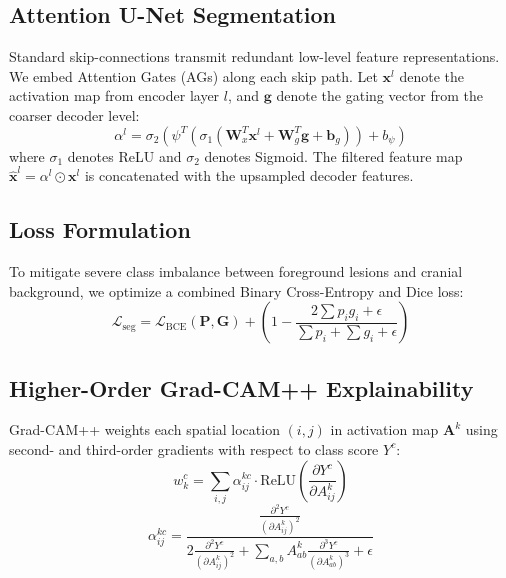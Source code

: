 \documentclass[conference]{IEEEtran}
\begin{document}
\subsection{Attention U-Net Segmentation}
Standard skip-connections transmit redundant low-level feature representations. We embed Attention Gates (AGs) \cite{oktay2018attention} along each skip path. Let $\mathbf{x}^l$ denote the activation map from encoder layer $l$, and $\mathbf{g}$ denote the gating vector from the coarser decoder level:
\begin{equation}
\alpha^l = \sigma_2\left(\psi^T \left(\sigma_1(\mathbf{W}_x^T \mathbf{x}^l + \mathbf{W}_g^T \mathbf{g} + \mathbf{b}_g)\right) + b_\psi\right)
\end{equation}
where $\sigma_1$ denotes ReLU and $\sigma_2$ denotes Sigmoid. The filtered feature map $\hat{\mathbf{x}}^l = \alpha^l \odot \mathbf{x}^l$ is concatenated with the upsampled decoder features.

\subsection{Loss Formulation}
To mitigate severe class imbalance between foreground lesions and cranial background, we optimize a combined Binary Cross-Entropy and Dice loss:
\begin{equation}
\mathcal{L}_{\text{seg}} = \mathcal{L}_{\text{BCE}}(\mathbf{P}, \mathbf{G}) + \left(1 - \frac{2 \sum p_i g_i + \epsilon}{\sum p_i + \sum g_i + \epsilon}\right)
\end{equation}

\subsection{Higher-Order Grad-CAM++ Explainability}
Grad-CAM++ weights each spatial location $(i, j)$ in activation map $\mathbf{A}^k$ using second- and third-order gradients with respect to class score $Y^c$:
\begin{equation}
w_k^c = \sum_{i,j} \alpha_{ij}^{kc} \cdot \text{ReLU}\left(\frac{\partial Y^c}{\partial A_{ij}^k}\right)
\end{equation}
\begin{equation}
\alpha_{ij}^{kc} = \frac{\frac{\partial^2 Y^c}{(\partial A_{ij}^k)^2}}{2 \frac{\partial^2 Y^c}{(\partial A_{ij}^k)^2} + \sum_{a,b} A_{ab}^k \frac{\partial^3 Y^c}{(\partial A_{ab}^k)^3} + \epsilon}
\end{equation}
\end{document}
